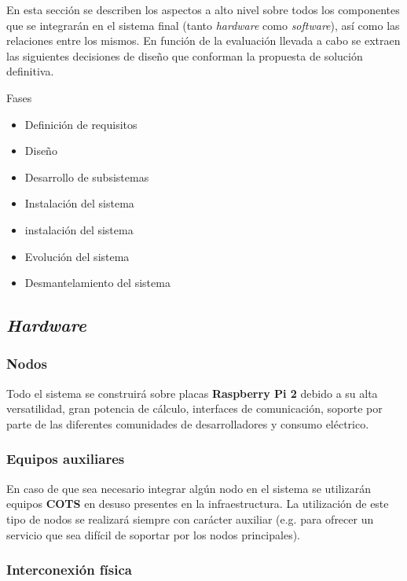 En esta sección se describen los aspectos a alto nivel sobre todos los componentes que se integrarán en el sistema final (tanto \textit{hardware} como \textit{software}), así como las relaciones entre los mismos. En función de la evaluación llevada a cabo se extraen las siguientes decisiones de diseño que conforman la propuesta de solución definitiva.

Fases
\begin{itemize}
  \item Definición de requisitos
  \item Diseño
  \item Desarrollo de subsistemas
  \item Instalación del sistema
  \item instalación del sistema
  \item Evolución del sistema
  \item Desmantelamiento del sistema
\end{itemize}

\subsection{\textit{Hardware}}

\subsubsection{Nodos}

Todo el sistema se construirá sobre placas \textbf{Raspberry Pi 2} debido a su alta versatilidad, gran potencia de cálculo, interfaces de comunicación, soporte por parte de las diferentes comunidades de desarrolladores y consumo eléctrico.

\subsubsection{Equipos auxiliares}

En caso de que sea necesario integrar algún nodo en el sistema se utilizarán equipos \textbf{COTS} en desuso presentes en la infraestructura. La utilización de este tipo de nodos se realizará siempre con carácter auxiliar (e.g. para ofrecer un servicio que sea difícil de soportar por los nodos principales).

\subsubsection{Interconexión física}

